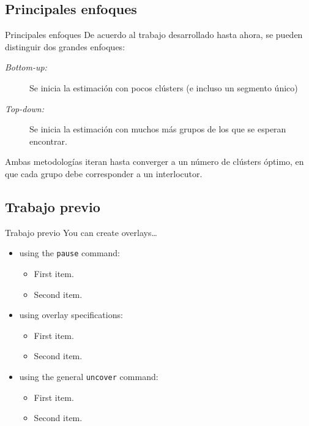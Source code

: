 \subsection{Principales enfoques}
\begin{frame}{Principales enfoques}
  De acuerdo al trabajo desarrollado hasta ahora, se pueden distinguir dos grandes enfoques:
  
  \begin{description}
    \item[\textit{Bottom-up:}]
      Se inicia la estimación con pocos clústers (e incluso un segmento único)
    \item[\textit{Top-down:}]
      Se inicia la estimación con muchos más grupos de los que se esperan encontrar.
  \end{description}

   Ambas metodologías iteran hasta converger a un número de clústers óptimo, en que cada grupo debe corresponder a un interlocutor.
\end{frame}    

\subsection{Trabajo previo}
\begin{frame}{Trabajo previo}
  You can create overlays\dots
  \begin{itemize}
  \item using the \texttt{pause} command:
    \begin{itemize}
    \item
      First item.
    \item    
      Second item.
    \end{itemize}
  \item
    using overlay specifications:
    \begin{itemize}
    \item
      First item.
    \item
      Second item.
    \end{itemize}
  \item
    using the general \texttt{uncover} command:
    \begin{itemize}
      \item
        First item.
      \item
        Second item.
    \end{itemize}
  \end{itemize}
\end{frame}
